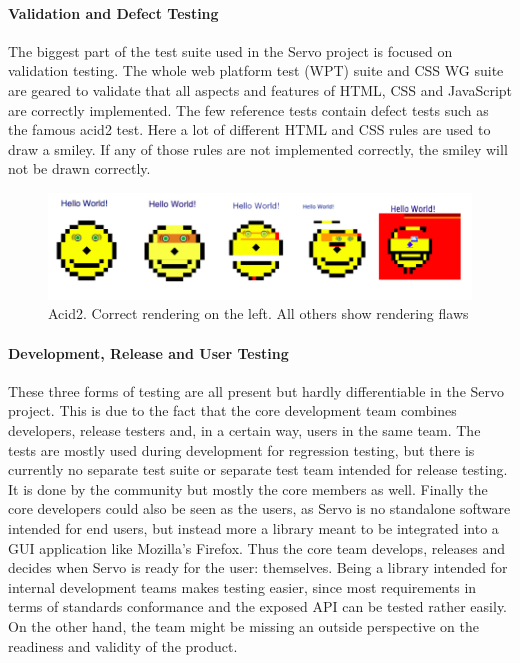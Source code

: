 \documentclass{scrartcl}
\begin{document}
\paragraph{Validation and Defect Testing}
The biggest part of the test suite used in the Servo project is focused on validation testing. The whole web platform test (WPT) suite and CSS WG suite are geared to validate that all aspects and features of HTML, CSS and JavaScript are correctly implemented. The few reference tests contain defect tests such as the famous acid2 test. Here a lot of different HTML and CSS rules are used to draw a smiley. If any of those rules are not implemented correctly, the smiley will not be drawn correctly.

\begin{figure}[h]
    \centering
    \includegraphics[width=\textwidth]{acid2}
    \caption{Acid2. Correct rendering on the left. All others show rendering flaws}
\end{figure}

\paragraph{Development, Release and User Testing}
These three forms of testing are all present but hardly differentiable in the Servo project. This is due to the fact that the core development team combines developers, release testers and, in a certain way, users in the same team. The tests are mostly used during development for regression testing, but there is currently no separate test suite or separate test team intended for release testing. It is done by the community but mostly the core members as well. Finally the core developers could also be seen as the users, as Servo is no standalone software intended for end users, but instead more a library meant to be integrated into a GUI application like Mozilla's Firefox. Thus the core team develops, releases and decides when Servo is ready for the user: themselves. Being a library intended for internal development teams makes testing easier, since most requirements in terms of standards conformance and the exposed API can be tested rather easily. On the other hand, the team might be missing an outside perspective on the readiness and validity of the product.
\end{document}
